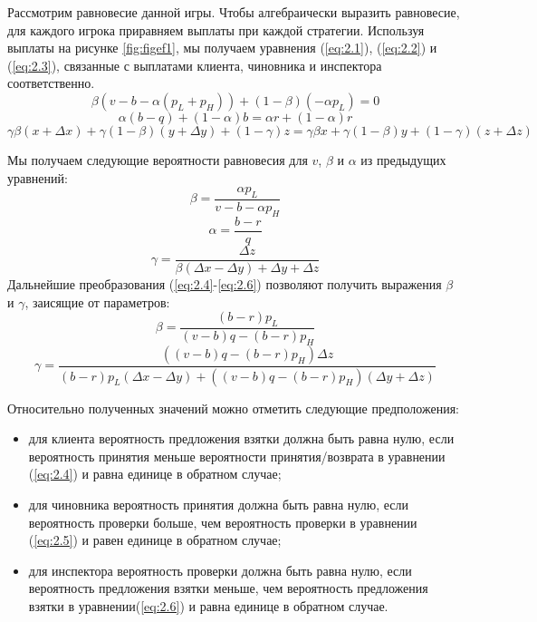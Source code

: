 \par
Рассмотрим равновесие данной игры. Чтобы алгебраически выразить равновесие, для каждого игрока приравняем выплаты при каждой стратегии. Используя выплаты на рисунке \ref{fig:figef1}, мы получаем уравнения (\ref{eq:2.1}), (\ref{eq:2.2}) и (\ref{eq:2.3}), связанные с выплатами клиента, чиновника и инспектора соответственно.
\begin{equation}\label{eq:2.1}
	\beta(v-b-\alpha(p_L + p_H)) + (1 - \beta)(-\alpha p_L)=0
\end{equation}
\begin{equation}\label{eq:2.2}
	\alpha(b-q) + (1-\alpha)b=\alpha r + (1-\alpha)r
\end{equation}
\begin{equation}\label{eq:2.3}
	\gamma \beta(x+\Delta x) + \gamma(1-\beta)(y+\Delta y) + (1 - \gamma)z = \gamma \beta x + \gamma(1-\beta)y + (1 - \gamma) (z + \Delta z)
\end{equation}
\par
Мы получаем следующие вероятности равновесия для $v$, $\beta$ и $\alpha$ из предыдущих уравнений:
\begin{equation}\label{eq:2.4}
	\beta = \frac{\alpha p_L}{v - b - \alpha p_H}
\end{equation}
\begin{equation}\label{eq:2.5}
	\alpha = \frac{b - r}{q}
\end{equation}
\begin{equation}\label{eq:2.6}
	\gamma = \frac{\Delta z}{\beta (\Delta x - \Delta y) + \Delta y + \Delta z}
\end{equation}
Дальнейшие преобразования (\ref{eq:2.4}-\ref{eq:2.6}) позволяют получить выражения $\beta$ и $\gamma$, заисящие от параметров:
\begin{equation}\label{eq:2.7}
	\beta = \frac{(b - r)p_L}{(v - b)q - (b - r)p_H}
\end{equation}
\begin{equation}\label{eq:2.8}
	\gamma = \frac{((v-b)q - (b - r)p_H)\Delta z}{(b-r)p_L(\Delta x - \Delta y) + ((v-b)q-(b-r)p_H)(\Delta y + \Delta z)}
\end{equation}
\par
Относительно полученных значений можно отметить следующие предположения:
\begin{itemize}
	\item для клиента вероятность предложения взятки должна быть равна нулю, если вероятность принятия меньше вероятности принятия/возврата в уравнении (\ref{eq:2.4}) и равна единице в обратном случае;
	\item для чиновника вероятность принятия должна быть равна нулю, если вероятность проверки больше, чем вероятность проверки в уравнении (\ref{eq:2.5}) и равен единице в обратном случае;
	\item для инспектора вероятность проверки должна быть равна нулю, если вероятность предложения взятки меньше, чем вероятность предложения взятки в уравнении(\ref{eq:2.6}) и равна единице в обратном случае.
\end{itemize}

